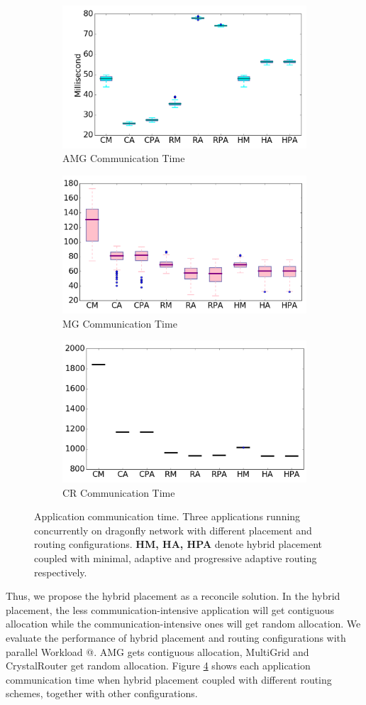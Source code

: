 \documentclass[conference,compsoc]{IEEEtran}
\makeatletter
\newcommand{\Rmnum}[1]{\expandafter\@slowromancap\romannumeral #1@}
\makeatother
\begin{document}
\begin{figure}[t!]
    \centering
    \begin{subfigure}[t]{0.32\textwidth}
        \centering
        \includegraphics[height=1.3 in]{hyb-plcmt/amg/commtime}
        \caption{AMG Communication Time}
        \label{fig:hyb-plcmt-amg-commtime}
    \end{subfigure}\hfill
    \hspace{1em}%
    \begin{subfigure}[t]{0.32\textwidth}
        \centering
        \includegraphics[height=1.3 in]{hyb-plcmt/mg/commtime}
        \caption{MG Communication Time}
        \label{fig:hyb-plcmt-mg-commtime}
    \end{subfigure}\hfill
    \begin{subfigure}[t]{0.32\textwidth}
        \centering
        \includegraphics[height=1.3 in]{hyb-plcmt/cr/commtime}
        \caption{CR Communication Time}
        \label{fig:hyb-plcmt-cr-commtime}
    \end{subfigure}%
   \caption{Application communication time. Three applications running concurrently on dragonfly network with different placement and routing configurations. \textbf{HM, HA, HPA} denote hybrid placement coupled with minimal, adaptive and progressive adaptive routing respectively. }
   \label{fig:hyb-plcmt-apps-commtime}
\end{figure}

Thus, we propose the hybrid placement as a reconcile solution. In the hybrid placement, the less communication-intensive application will get contiguous allocation while the communication-intensive ones will get random allocation. We evaluate the performance of hybrid placement and routing configurations with parallel Workload \Rmnum{1}. AMG gets contiguous allocation, MultiGrid and CrystalRouter get random allocation. Figure \ref{fig:hyb-plcmt-apps-commtime} shows each application communication time when hybrid placement coupled with different routing schemes, together with other configurations. 
\end{document}
